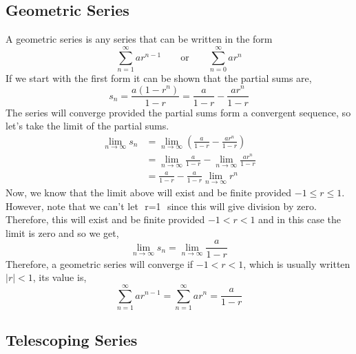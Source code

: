 \documentclass[10pt,reqno]{book}
\theoremstyle{definition}
\begin{document}
	\subsection*{Geometric Series}
	
	A geometric series is any series that can be written in the form
	\[ \sum\limits_{n=1}^{\infty} ar^{n-1} \qquad \text{or} \qquad \sum\limits_{n=0}^{\infty} ar^n  \]
	If we start with the first form it can be shown that the partial sums are,
	\[ s_n = \frac{a(1 - r^n)}{1-r} = \frac{a}{1-r} - \frac{ar^n}{1-r} \]
	The series will converge provided the partial sums form a convergent sequence, so let's take the limit of the partial sums.
	\begin{align*}
		\lim\limits_{n \to \infty} s_n &= \lim\limits_{n \to \infty}\left( \frac{a}{1-r} - \frac{ar^n}{1-r} \right)\\
		&= \lim\limits_{n \to \infty} \frac{a}{1-r} - \lim\limits_{n \to \infty} \frac{ar^n}{1-r}\\
		&= \frac{a}{1-r} - \frac{a}{1-r} \lim\limits_{n \to \infty} r^n
	\end{align*}
	Now, we know that the limit above will exist and be finite provided $ -1 \leq r \leq 1 $. However, note that we can't let $ $ r=1 $ $ since this will give division by zero. Therefore, this will exist and be finite provided $ -1 < r < 1 $ and in this case the limit is zero and so we get,
	\[ \lim\limits_{n \to \infty} s_n = \lim\limits_{n \to \infty} \frac{a}{1-r} \]
	Therefore, a geometric series will converge if $ -1 < r < 1 $, which is usually written $ |r| < 1 $, its value is,
	\[ \sum\limits_{n=1}^{\infty} ar^{n-1} = \sum\limits_{n=1}^{\infty} ar^n = \frac{a}{1-r} \]
	
	\subsection*{Telescoping Series}
	
\end{document}
